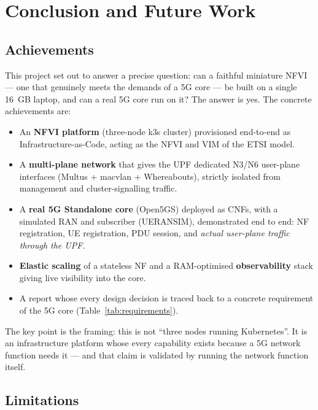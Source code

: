 \section{Conclusion and Future Work}

\subsection{Achievements}

This project set out to answer a precise question: can a faithful miniature
NFVI --- one that genuinely meets the demands of a 5G core --- be built on a
single 16~GB laptop, and can a real 5G core run on it? The answer is yes. The
concrete achievements are:

\begin{itemize}
    \item An \textbf{NFVI platform} (three-node k3s cluster) provisioned
          end-to-end as Infrastructure-as-Code, acting as the NFVI and VIM of
          the ETSI model.
    \item A \textbf{multi-plane network} that gives the UPF dedicated N3/N6
          user-plane interfaces (Multus + macvlan + Whereabouts), strictly
          isolated from management and cluster-signalling traffic.
    \item A \textbf{real 5G Standalone core} (Open5GS) deployed as CNFs, with a
          simulated RAN and subscriber (UERANSIM), demonstrated end to end:
          NF registration, UE registration, PDU session, and \emph{actual
          user-plane traffic through the UPF}.
    \item \textbf{Elastic scaling} of a stateless NF and a RAM-optimised
          \textbf{observability} stack giving live visibility into the core.
    \item A report whose every design decision is traced back to a concrete
          requirement of the 5G core (Table~\ref{tab:requirements}).
\end{itemize}

The key point is the framing: this is not ``three nodes running Kubernetes''.
It is an infrastructure platform whose every capability exists because a 5G
network function needs it --- and that claim is validated by running the
network function itself.

\subsection{Limitations}

